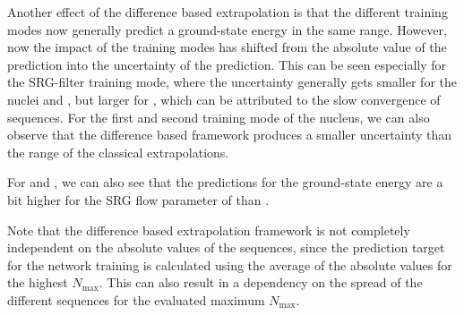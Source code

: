 


Another effect of the difference based extrapolation is that the different training modes now generally predict a ground-state energy in the same range. However, now the impact of the training modes has shifted from the absolute value of the prediction into the uncertainty of the prediction. This can be seen especially for the SRG-filter training mode, where the uncertainty generally gets smaller for the nuclei  and , but larger for , which can be attributed to the slow convergence of  sequences.
For the first and second training mode of the  nucleus, we can also observe that the difference based framework produces a smaller uncertainty than the range of the classical extrapolations.

For  and , we can also see that the predictions for the ground-state energy are a bit higher for the SRG flow parameter of  than .

Note that the difference based extrapolation framework is not completely independent on the absolute values of the sequences, since the prediction target for the network training is calculated using the average of the absolute values for the highest $N_\mathrm{max}$. This can also result in a dependency on the spread of the different sequences for the evaluated maximum $N_\mathrm{max}$.

